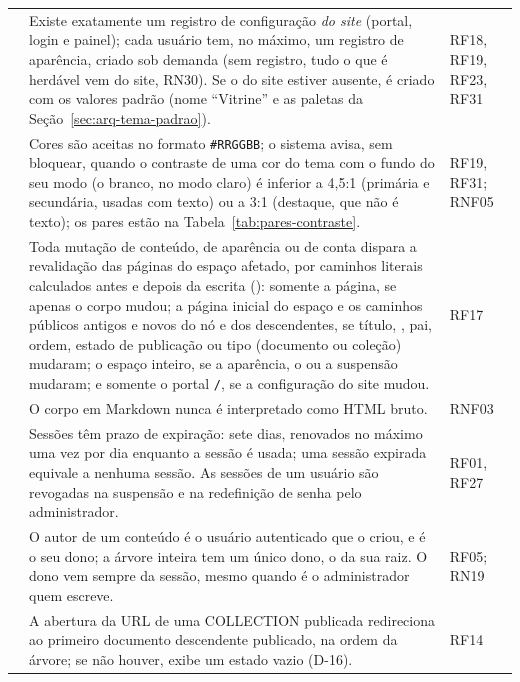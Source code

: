 \begin{longtable}{@{}L{1.3cm}L{9.6cm}L{2.8cm}@{}}
 & Existe exatamente um registro de configuração \emph{do site} (portal, login e painel); cada usuário tem, no máximo, um registro de aparência, criado sob demanda (sem registro, tudo o que é herdável vem do site, RN30). Se o do site estiver ausente, é criado com os valores padrão (nome ``Vitrine'' e as paletas da Seção~\ref{sec:arq-tema-padrao}). & RF18, RF19, RF23, RF31\\[1pt]
 & Cores são aceitas no formato \texttt{\#RRGGBB}; o sistema avisa, sem bloquear, quando o contraste de uma cor do tema com o fundo do seu modo (o branco, no modo claro) é inferior a 4,5:1 (primária e secundária, usadas com texto) ou a 3:1 (destaque, que não é texto); os pares estão na Tabela~\ref{tab:pares-contraste}. & RF19, RF31; RNF05\\[1pt]
 & Toda mutação de conteúdo, de aparência ou de conta dispara a revalidação das páginas do espaço afetado, por caminhos literais calculados antes e depois da escrita (): somente a página, se apenas o corpo mudou; a página inicial do espaço e os caminhos públicos antigos e novos do nó e dos descendentes, se título, , pai, ordem, estado de publicação ou tipo (documento ou coleção) mudaram; o espaço inteiro, se a aparência, o  ou a suspensão mudaram; e somente o portal \texttt{/}, se a configuração do site mudou. & RF17\\[1pt]
 & O corpo em Markdown nunca é interpretado como HTML bruto. & RNF03\\[1pt]
 & Sessões têm prazo de expiração: sete dias, renovados no máximo uma vez por dia enquanto a sessão é usada; uma sessão expirada equivale a nenhuma sessão. As sessões de um usuário são revogadas na suspensão e na redefinição de senha pelo administrador. & RF01, RF27\\[1pt]
 & O autor de um conteúdo é o usuário autenticado que o criou, e é o seu dono; a árvore inteira tem um único dono, o da sua raiz. O dono vem sempre da sessão, mesmo quando é o administrador quem escreve. & RF05; RN19\\[1pt]
 & A abertura da URL de uma COLLECTION publicada redireciona ao primeiro documento descendente publicado, na ordem da árvore; se não houver, exibe um estado vazio (D-16). & RF14\\[1pt]

\end{longtable}
